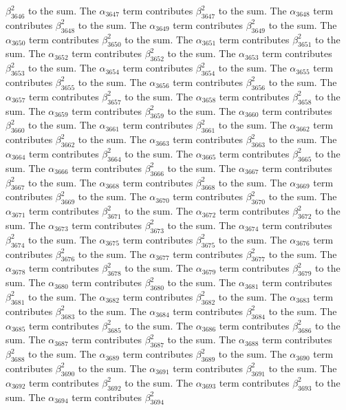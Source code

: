 \begin{lemma}
$\beta_{3646}^{2}$ to the sum. The $\alpha_{3647}$ term contributes $\beta_{3647}^{2}$ to the sum. The $\alpha_{3648}$ term contributes $\beta_{3648}^{2}$ to the sum. The $\alpha_{3649}$ term contributes $\beta_{3649}^{2}$ to the sum. The $\alpha_{3650}$ term contributes $\beta_{3650}^{2}$ to the sum. The $\alpha_{3651}$ term contributes $\beta_{3651}^{2}$ to the sum. The $\alpha_{3652}$ term contributes $\beta_{3652}^{2}$ to the sum. The $\alpha_{3653}$ term contributes $\beta_{3653}^{2}$ to the sum. The $\alpha_{3654}$ term contributes $\beta_{3654}^{2}$ to the sum. The $\alpha_{3655}$ term contributes $\beta_{3655}^{2}$ to the sum. The $\alpha_{3656}$ term contributes $\beta_{3656}^{2}$ to the sum. The $\alpha_{3657}$ term contributes $\beta_{3657}^{2}$ to the sum. The $\alpha_{3658}$ term contributes $\beta_{3658}^{2}$ to the sum. The $\alpha_{3659}$ term contributes $\beta_{3659}^{2}$ to the sum. The $\alpha_{3660}$ term contributes $\beta_{3660}^{2}$ to the sum. The $\alpha_{3661}$ term contributes $\beta_{3661}^{2}$ to the sum. The $\alpha_{3662}$ term contributes $\beta_{3662}^{2}$ to the sum. The $\alpha_{3663}$ term contributes $\beta_{3663}^{2}$ to the sum. The $\alpha_{3664}$ term contributes $\beta_{3664}^{2}$ to the sum. The $\alpha_{3665}$ term contributes $\beta_{3665}^{2}$ to the sum. The $\alpha_{3666}$ term contributes $\beta_{3666}^{2}$ to the sum. The $\alpha_{3667}$ term contributes $\beta_{3667}^{2}$ to the sum. The $\alpha_{3668}$ term contributes $\beta_{3668}^{2}$ to the sum. The $\alpha_{3669}$ term contributes $\beta_{3669}^{2}$ to the sum. The $\alpha_{3670}$ term contributes $\beta_{3670}^{2}$ to the sum. The $\alpha_{3671}$ term contributes $\beta_{3671}^{2}$ to the sum. The $\alpha_{3672}$ term contributes $\beta_{3672}^{2}$ to the sum. The $\alpha_{3673}$ term contributes $\beta_{3673}^{2}$ to the sum. The $\alpha_{3674}$ term contributes $\beta_{3674}^{2}$ to the sum. The $\alpha_{3675}$ term contributes $\beta_{3675}^{2}$ to the sum. The $\alpha_{3676}$ term contributes $\beta_{3676}^{2}$ to the sum. The $\alpha_{3677}$ term contributes $\beta_{3677}^{2}$ to the sum. The $\alpha_{3678}$ term contributes $\beta_{3678}^{2}$ to the sum. The $\alpha_{3679}$ term contributes $\beta_{3679}^{2}$ to the sum. The $\alpha_{3680}$ term contributes $\beta_{3680}^{2}$ to the sum. The $\alpha_{3681}$ term contributes $\beta_{3681}^{2}$ to the sum. The $\alpha_{3682}$ term contributes $\beta_{3682}^{2}$ to the sum. The $\alpha_{3683}$ term contributes $\beta_{3683}^{2}$ to the sum. The $\alpha_{3684}$ term contributes $\beta_{3684}^{2}$ to the sum. The $\alpha_{3685}$ term contributes $\beta_{3685}^{2}$ to the sum. The $\alpha_{3686}$ term contributes $\beta_{3686}^{2}$ to the sum. The $\alpha_{3687}$ term contributes $\beta_{3687}^{2}$ to the sum. The $\alpha_{3688}$ term contributes $\beta_{3688}^{2}$ to the sum. The $\alpha_{3689}$ term contributes $\beta_{3689}^{2}$ to the sum. The $\alpha_{3690}$ term contributes $\beta_{3690}^{2}$ to the sum. The $\alpha_{3691}$ term contributes $\beta_{3691}^{2}$ to the sum. The $\alpha_{3692}$ term contributes $\beta_{3692}^{2}$ to the sum. The $\alpha_{3693}$ term contributes $\beta_{3693}^{2}$ to the sum. The $\alpha_{3694}$ term contributes $\beta_{3694}^{2}$ 
\end{lemma}

